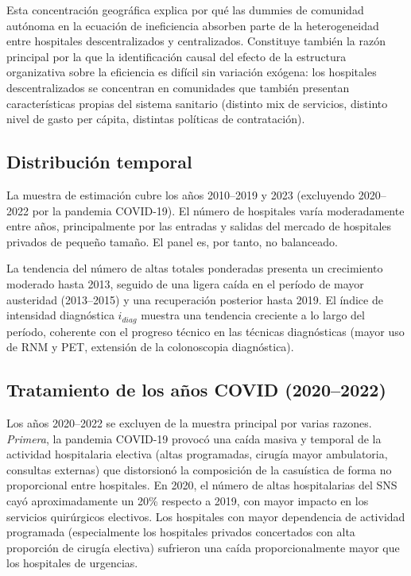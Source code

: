 \documentclass[12pt, a4paper, twoside, openright]{book}
\theoremstyle{plain}
\theoremstyle{definition}
\theoremstyle{remark}
\begin{document}
Esta concentración geográfica explica por qué las dummies de comunidad autónoma en la ecuación de ineficiencia absorben parte de la heterogeneidad entre hospitales descentralizados y centralizados. Constituye también la razón principal por la que la identificación causal del efecto de la estructura organizativa sobre la eficiencia es difícil sin variación exógena: los hospitales descentralizados se concentran en comunidades que también presentan características propias del sistema sanitario (distinto mix de servicios, distinto nivel de gasto per cápita, distintas políticas de contratación).

\subsection{Distribución temporal}

La muestra de estimación cubre los años 2010--2019 y 2023 (excluyendo 2020--2022 por la pandemia COVID-19). El número de hospitales varía moderadamente entre años, principalmente por las entradas y salidas del mercado de hospitales privados de pequeño tamaño. El panel es, por tanto, no balanceado.

La tendencia del número de altas totales ponderadas presenta un crecimiento moderado hasta 2013, seguido de una ligera caída en el período de mayor austeridad (2013--2015) y una recuperación posterior hasta 2019. El índice de intensidad diagnóstica $i_{diag}$ muestra una tendencia creciente a lo largo del período, coherente con el progreso técnico en las técnicas diagnósticas (mayor uso de RNM y PET, extensión de la colonoscopia diagnóstica).

\subsection{Tratamiento de los años COVID (2020--2022)}

Los años 2020--2022 se excluyen de la muestra principal por varias razones. \textit{Primera}, la pandemia COVID-19 provocó una caída masiva y temporal de la actividad hospitalaria electiva (altas programadas, cirugía mayor ambulatoria, consultas externas) que distorsionó la composición de la casuística de forma no proporcional entre hospitales. En 2020, el número de altas hospitalarias del SNS cayó aproximadamente un 20\% respecto a 2019, con mayor impacto en los servicios quirúrgicos electivos. Los hospitales con mayor dependencia de actividad programada (especialmente los hospitales privados concertados con alta proporción de cirugía electiva) sufrieron una caída proporcionalmente mayor que los hospitales de urgencias.
\end{document}
